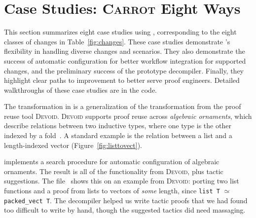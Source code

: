\section{Case Studies: \textsc{Carrot} Eight Ways}
\label{sec:search}

This section summarizes eight case studies using \toolname,
corresponding to the eight classes of changes in Table~\ref{fig:changes}.
These case studies demonstrate \toolname's flexibility in handling diverse changes and scenarios.
They also demonstrate the success of automatic configuration for better workflow integration for supported changes,
and the preliminary success of the prototype decompiler.
Finally, they highlight clear paths to improvement to better serve proof engineers. 
Detailed walkthroughs of these case studies are in the code.

The transformation in \toolname is a generalization of the transformation from the proof reuse tool \textsc{Devoid}.
\textsc{Devoid} supports proof reuse across \textit{algebraic ornaments}, which describe relations
between two inductive types, where one type is the other indexed by a fold~\cite{mcbride}.
A standard example is the relation between a list and a
length-indexed vector (Figure~\ref{fig:listtovect}).

\toolname implements a search procedure for automatic configuration of algebraic ornaments.
The result is all of the functionality from \textsc{Devoid}, plus tactic suggestions.
The file~ shows this on an example from \textsc{Devoid}:
porting two list functions and a proof from lists to vectors of \textit{some} length, since \lstinline{list T} $\simeq$ \lstinline{packed_vect T}.
The decompiler helped us write tactic proofs that we had found
too difficult to write by hand,
though the suggested tactics did need massaging. %

